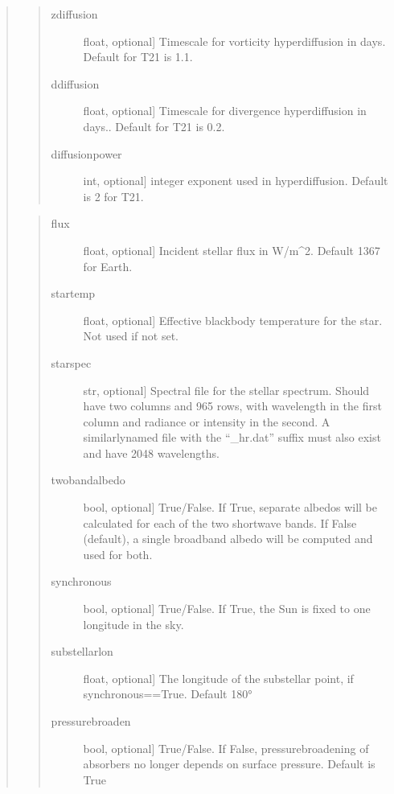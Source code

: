 \documentclass[letterpaper,10pt,english]{sphinxmanual}
\begin{document}
\begin{fulllineitems}
\begin{fulllineitems}
\begin{quote}
\begin{quote}
\begin{description}
\item[{zdiffusion}] \leavevmode{[}float, optional{]}
Timescale for vorticity hyperdiffusion in days. Default for T21 is 1.1.

\item[{ddiffusion}] \leavevmode{[}float, optional{]}
Timescale for divergence hyperdiffusion in days.. Default for T21 is 0.2.

\item[{diffusionpower}] \leavevmode{[}int, optional{]}
integer exponent used in hyperdiffusion. Default is 2 for T21.

\end{description}
\end{quote}

\begin{quote}
\begin{description}
\item[{flux}] \leavevmode{[}float, optional{]}
Incident stellar flux in W/m\textasciicircum{}2. Default 1367 for Earth.

\item[{startemp}] \leavevmode{[}float, optional{]}
Effective blackbody temperature for the star. Not used if not set.

\item[{starspec}] \leavevmode{[}str, optional{]}
Spectral file for the stellar spectrum. Should have two columns and 965 rows,
with wavelength in the first column and radiance or intensity in the second.
A similarly\sphinxhyphen{}named file with the “\_hr.dat” suffix must also exist and have
2048 wavelengths.

\item[{twobandalbedo}] \leavevmode{[}bool, optional{]}
True/False. If True, separate albedos will be calculated for each of the
two shortwave bands. If False (default), a single broadband albedo will be
computed and used for both.

\item[{synchronous}] \leavevmode{[}bool, optional{]}
True/False. If True, the Sun is fixed to one longitude in the sky.

\item[{substellarlon}] \leavevmode{[}float, optional{]}
The longitude of the substellar point, if synchronous==True. Default 180°

\item[{pressurebroaden}] \leavevmode{[}bool, optional{]}
True/False. If False, pressure\sphinxhyphen{}broadening of absorbers no longer depends
on surface pressure. Default is True


\end{description}
\end{quote}
\end{quote}
\end{fulllineitems}
\end{fulllineitems}
\end{document}
